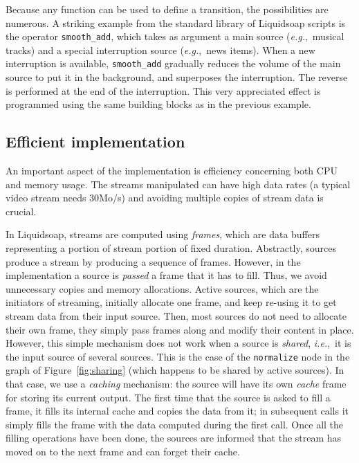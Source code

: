 \documentclass{llncs}
\newcommand{\liquidsoap}{Liquidsoap}
\newcommand{\eg}{\emph{e.g.},}
\newcommand{\ie}{\emph{i.e.},}
\begin{document}
Because any function can be used to define a transition, the possibilities
are numerous. A striking example from the standard library of \liquidsoap{}
scripts is the operator \texttt{smooth\_add}, which takes as
argument a main source (\eg\ musical tracks) and a special interruption
source (\eg\ news items).
When a new interruption is available, \texttt{smooth\_add} gradually
reduces the volume of the main source to put it in the background,
and superposes the interruption. The reverse is performed at the
end of the interruption.
This very appreciated effect is programmed using the same building blocks
as in the previous example.

\subsection{Efficient implementation}

An important aspect of the implementation is efficiency concerning both CPU and
memory usage. The streams manipulated can have high data rates (a typical video
stream needs 30Mo/s) and avoiding multiple copies of stream data is
crucial.

In \liquidsoap, streams are computed using \emph{frames},
which are data buffers representing a portion of stream portion of fixed
duration.
Abstractly, sources produce a stream by producing a sequence of frames.
However, in the implementation a source is \emph{passed} a frame
that it has to fill.
Thus, we avoid unnecessary copies and memory allocations.
Active sources, which are the initiators of streaming,
initially allocate one frame, and keep re-using it to get stream data
from their input source.
Then, most sources do not need to allocate their own frame,
they simply pass frames along and modify their content in place.
However, this simple mechanism does not work when a source is \emph{shared},
\ie\ it is the input source of several sources.
This is the case of the \verb.normalize. node in the graph of
Figure~\ref{fig:sharing} (which happens to be shared by active sources).
In that case, we use a \emph{caching} mechanism:
the source will have its own \emph{cache} frame
for storing its current output.
The first time that the source is asked to fill a frame,
it fills its internal cache and copies the data from it;
in subsequent calls it simply fills the frame with the data computed
during the first call.
Once all the filling operations have been done, the
sources are informed that the stream has moved on to the next frame and can
forget their cache.
\end{document}

